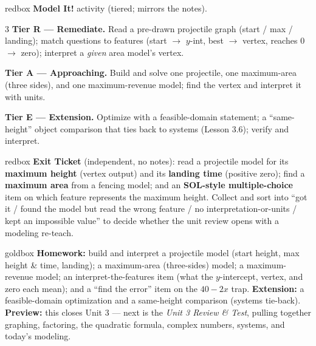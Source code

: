\documentclass[10pt]{article}
\begin{document}
\begin{skillbox}{redbox}
\textbf{Model It!} activity (tiered; mirrors the notes).
\begin{multicols}{3}
\textbf{Tier R --- Remediate.} Read a pre-drawn projectile graph (start / max / landing); match questions to features
(start $\to$ $y$-int, best $\to$ vertex, reaches $0$ $\to$ zero); interpret a \emph{given} area model's vertex.

\columnbreak
\textbf{Tier A --- Approaching.} Build and solve one projectile, one maximum-area (three sides), and one
maximum-revenue model; find the vertex and interpret it with units.

\columnbreak
\textbf{Tier E --- Extension.} Optimize with a feasible-domain statement; a ``same-height'' object comparison that
ties back to systems (Lesson 3.6); verify and interpret.
\end{multicols}
\end{skillbox}

\begin{skillbox}{redbox}
\textbf{Exit Ticket} (independent, no notes): read a projectile model for its \textbf{maximum height} (vertex output)
and its \textbf{landing time} (positive zero); find a \textbf{maximum area} from a fencing model; and an
\textbf{SOL-style multiple-choice} item on which feature represents the maximum height. Collect and sort into ``got
it / found the model but read the wrong feature / no interpretation-or-units / kept an impossible value'' to decide
whether the unit review opens with a modeling re-teach.
\end{skillbox}

\begin{skillbox}{goldbox}
\textbf{Homework:} build and interpret a projectile model (start height, max height \& time, landing); a
maximum-area (three-sides) model; a maximum-revenue model; an interpret-the-features item (what the $y$-intercept,
vertex, and zero each mean); and a ``find the error'' item on the $40-2x$ trap. \textbf{Extension:} a feasible-domain
optimization and a same-height comparison (systems tie-back). \textbf{Preview:} this closes Unit 3 --- next is the
\emph{Unit 3 Review \& Test}, pulling together graphing, factoring, the quadratic formula, complex numbers, systems,
and today's modeling.
\end{skillbox}
\end{document}
